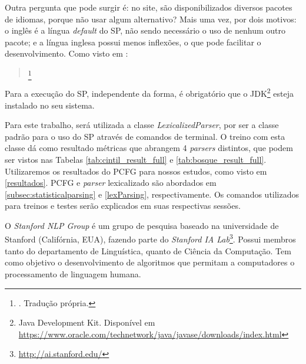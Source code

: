Outra pergunta que pode surgir é: no site, são disponibilizados diversos pacotes de idiomas, porque não usar algum alternativo? Mais uma vez, por dois motivos: o inglês é a língua \textit{default} do SP, não sendo necessário o uso de nenhum outro pacote; e a língua inglesa possui menos inflexões, o que pode facilitar o desenvolvimento. Como visto em :
\begin{quote}
    \footnote{. Tradução própria.}
\end{quote}

Para a execução do SP, independente da forma, é obrigatório que o JDK\footnote{Java Development Kit. Disponível em \url{https://www.oracle.com/technetwork/java/javase/downloads/index.html}} esteja instalado no seu sistema.

Para este trabalho, será utilizada a classe \textit{LexicalizedParser}, por ser a classe padrão para o uso do SP através de comandos de terminal. O treino com esta classe dá como resultado métricas que abrangem 4 \textit{parsers} distintos, que podem ser vistos nas Tabelas \ref{tab:cintil_result_full} e \ref{tab:bosque_result_full}. Utilizaremos os resultados do PCFG para nossos estudos, como visto em \ref{resultados}. PCFG e \textit{parser} lexicalizado são abordados em \ref{subsec:statisticalparsing} e \ref{lexParsing}, respectivamente.
Os comandos utilizados para treinos e testes serão explicados em suas respectivas sessões.

O \textit{Stanford NLP Group} é um grupo de pesquisa baseado na universidade de Stanford (Califórnia, EUA), fazendo parte do \textit{Stanford IA Lab}\footnote{\url{http://ai.stanford.edu/}}. Possui membros tanto do departamento de Linguística, quanto de Ciência da Computação. Tem como objetivo o desenvolvimento de algoritmos que permitam a computadores o processamento de linguagem humana. 


